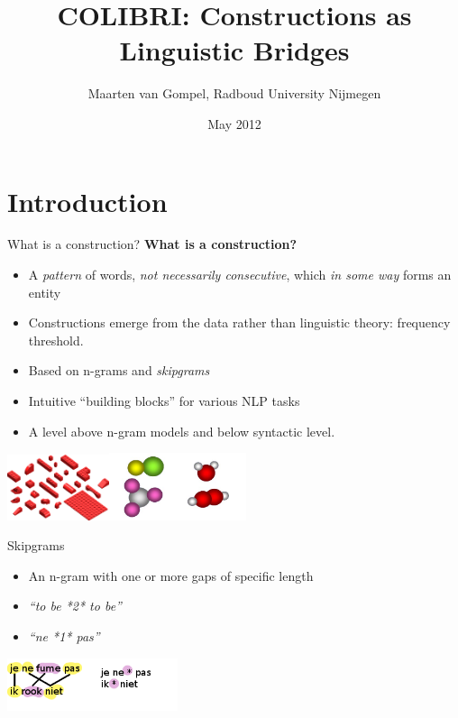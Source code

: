 \documentclass[compress]{beamer}
\title{COLIBRI: Constructions as Linguistic Bridges}
\author{Maarten van Gompel, Radboud University Nijmegen}
\date{May 2012}
\def\smallraccoon{
\makebox[\linewidth][c]{\texttt{[image: /home/proycon/Pictures/All/raccoon.pdf]}\FloatBarrier}
}
\begin{document}
\begin{frame}
	\titlepage
\end{frame}

\section{Introduction}



\begin{frame}
	\begin{block}{What is a construction?}
		\textbf{What is a construction?}  \\
		\begin{itemize}
			\item A \emph{pattern} of words, \emph{not necessarily consecutive},  which \emph{in some way} forms an entity
			\item Constructions emerge from the data rather than linguistic theory: frequency threshold.
			\item Based on n-grams and \emph{skipgrams}
			\item Intuitive ``building blocks'' for various NLP tasks
			\item A level above n-gram models and below syntactic level.
		\end{itemize}
	\end{block}
	 \includegraphics[width=30.0mm]{lego.jpg}\includegraphics[width=40.0mm]{molecules.jpg} 
\end{frame}


\begin{frame}
	\begin{block}{Skipgrams}
		\begin{itemize}
			\item An n-gram with one or more gaps of specific length
			\item \emph{``to be *2* to be''}
			\item \emph{``ne *1* pas''}
		\end{itemize}
		\begin{center}
			 \includegraphics[width=50.0mm]{skipgram.png}
		\end{center}		
	\end{block}
\end{frame}
\end{document}
